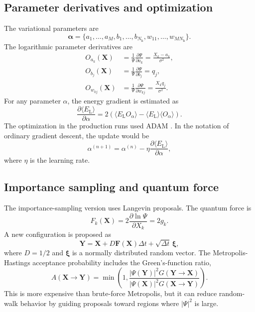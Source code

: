 \documentclass[10pt,a4paper]{article}
\newcommand{\bX}{\mathbf{X}}
\newcommand{\EL}{E_{\mathrm{L}}}
\newcommand{\Nh}{N_{\mathrm{h}}}
\begin{document}
\subsection{Parameter derivatives and optimization}

The variational parameters are
\begin{equation}
\bm{\alpha}=\{a_1,\ldots,a_M,b_1,\ldots,b_{\Nh},w_{11},\ldots,w_{M\Nh}\}.
\end{equation}
The logarithmic parameter derivatives are
\begin{align}
O_{a_k}(\bX)&=\frac{1}{\Psi}\frac{\partial \Psi}{\partial a_k}=\frac{X_k-a_k}{\sigma^2},\\
O_{b_j}(\bX)&=\frac{1}{\Psi}\frac{\partial \Psi}{\partial b_j}=q_j,\\
O_{w_{kj}}(\bX)&=\frac{1}{\Psi}\frac{\partial \Psi}{\partial w_{kj}}=\frac{X_kq_j}{\sigma^2}.
\end{align}
For any parameter $\alpha$, the energy gradient is estimated as
\begin{equation}
\frac{\partial \langle \EL\rangle}{\partial \alpha}
=
2\left(\langle \EL O_{\alpha}\rangle-\langle\EL\rangle\langle O_{\alpha}\rangle\right).
\label{eq:gradient}
\end{equation}
The optimization in the production runs used ADAM \cite{kingma2015}. In the notation of ordinary gradient descent, the update would be
\begin{equation}
\alpha^{(n+1)}=\alpha^{(n)}-\eta\frac{\partial \langle \EL\rangle}{\partial \alpha},
\end{equation}
where $\eta$ is the learning rate.

\subsection{Importance sampling and quantum force}

The importance-sampling version uses Langevin proposals. The quantum force is
\begin{equation}
F_k(\bX)=2\frac{\partial\ln\Psi}{\partial X_k}=2g_k.
\label{eq:quantum-force}
\end{equation}
A new configuration is proposed as
\begin{equation}
\mathbf{Y}=\bX+D\mathbf{F}(\bX)\Delta t+\sqrt{\Delta t}\,\bm{\xi},
\end{equation}
where $D=1/2$ and $\bm{\xi}$ is a normally distributed random vector. The Metropolis-Hastings acceptance probability includes the Green's-function ratio,
\begin{equation}
A(\bX\rightarrow\mathbf{Y})=
\min\left(1,
\frac{|\Psi(\mathbf{Y})|^2G(\mathbf{Y}\rightarrow\bX)}{|\Psi(\bX)|^2G(\bX\rightarrow\mathbf{Y})}
\right).
\end{equation}
This is more expensive than brute-force Metropolis, but it can reduce random-walk behavior by guiding proposals toward regions where $|\Psi|^2$ is large.
\end{document}
